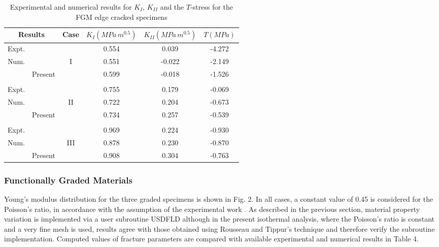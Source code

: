 \begin{table*}[!ht]
\caption{Experimental and numerical results for $K_I$, $K_{II}$ and the $T$-stress for the FGM edge cracked specimens}
\centering
\begin{tabular}{c c c c c c} 
\hline \hline
 \multicolumn{2}{c}{Results} & Case & $K_I (M\!Pa\,m^{0.5})$ & $K_{II} (M\!Pa\,m^{0.5})$ & $T (M\!Pa)$\\
 \hline
 Expt. & \cite{Abanto-Bueno2006}& & 0.554 & 0.039 & -4.272\\
 \multirow{2}{*}{Num.} & \cite{Oral2008}& I & 0.551 & -0.022 & -2.149\\
 & Present & & 0.599 & -0.018 & -1.526\\ 
 \\
 Expt. & \cite{Abanto-Bueno2006} & & 0.755 & 0.179 & -0.069\\
 \multirow{2}{*}{Num.} & \cite{Oral2008}& II & 0.722 & 0.204 & -0.673\\
 & Present & & 0.734 & 0.257 & -0.539\\
 \\
 Expt. & \cite{Abanto-Bueno2006} & & 0.969 & 0.224 & -0.930\\
 \multirow{2}{*}{Num.} & \cite{Oral2008}& III & 0.878 & 0.230 & -0.870\\
 & Present & & 0.908 & 0.304 & -0.763\\
 \hline \hline 
\end{tabular}
\label{tab:Table4}
\end{table*}
\vspace{10pt}

\subsubsection{Functionally Graded Materials}

Young's modulus distribution for the three graded specimens is shown in Fig. 2. In all cases, a constant value of 0.45 is considered for the Poisson's ratio, in accordance with the assumption of the experimental work \cite{Abanto-Bueno2006}. As described in the previous section, material property variation is implemented via a user subroutine USDFLD although in the present isothermal analysis, where the Poisson's ratio is constant and a very fine mesh is used, results agree with those obtained using Rousseau and Tippur's technique and therefore verify the subroutine implementation. Computed values of fracture parameters are compared with available experimental and numerical results in Table 4.

